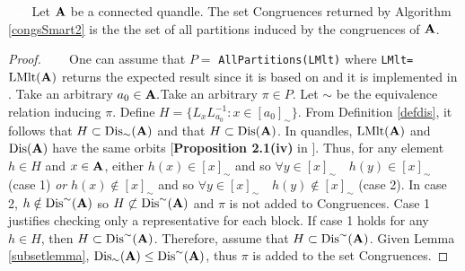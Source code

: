 \begin{theorem}\textcolor{white}{line}\newline
Let $\mathbf{A}$ be a connected quandle. The set \textsf{Congruences} returned by Algorithm \ref{congsSmart2} is the the set of all partitions induced by the congruences of $\mathbf{A}$.
\begin{proof}\textcolor{white}{line}\newline
One can assume that $P=$ \texttt{AllPartitions(LMlt)} where \texttt{LMlt=}$\operatorname{LMlt}(\mathbf{A})$ returns the expected result since it is based on \cite{schonert1994finding,seress_2003} and it is implemented in \magma. Take an arbitrary $a_0 \in \mathbf{A}. $\newline Take an arbitrary $\pi \in P$. Let $\sim$ be the equivalence relation inducing $\pi$.  Define $H = \{L_xL_{a_0}^{-1} : x \in [a_0]_\sim\}$. From Definition \ref{defdis}, it follows that $H\subset \operatorname{Dis}_\sim(\mathbf{A})$ and that $H\subset \operatorname{Dis}(\mathbf{A})$.
In quandles, $\operatorname{LMlt}(\mathbf{A})$ and $\operatorname{Dis}(\mathbf{A})$ have the same orbits [\textbf{Proposition 2.1(iv)} in \cite{hulpke2016connected}]. Thus, for any element $h\in H$ and $x\in \mathbf{A}$, either $h(x)\in [x]_\sim$ and so $\forall y \in [x]_\sim\quad h(y)\in[x]_\sim$ (case 1) \emph{or} $h(x)\notin [x]_\sim$ and so $\forall y \in [x]_\sim \quad h(y)\notin [x]_\sim$ (case 2). In case 2, $h \notin \operatorname{Dis}^\sim(\mathbf{A})$ so $H \not\subset \operatorname{Dis}^\sim(\mathbf{A})$ and $\pi$ is not added to \textsf{Congruences}. Case 1 justifies checking only a representative for each block. If case 1 holds for any $h \in H$, then $H \subset \operatorname{Dis}^\sim(\mathbf{A})$.\newline
Therefore, assume that $H \subset \operatorname{Dis}^\sim(\mathbf{A})$.\newline
Given Lemma \ref{subsetlemma}, $\operatorname{Dis}_{\sim}(\mathbf{A})\leq \operatorname{Dis}^{\sim}(\mathbf{A})$, thus $\pi$ is added to the set \textsf{Congruences}.

\end{proof}
\end{theorem}
